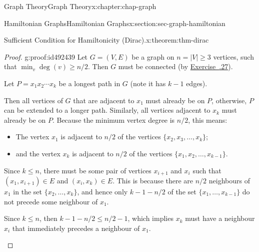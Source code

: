 \documentclass[oneside,10pt,]{book}
\newcommand{\xreffont}{\relax}
\numberwithin{equation}{section}
\begin{document}
\begin{chapterptx}{Graph Theory}{}{Graph Theory}{}{}{x:chapter:chap-graph}
\begin{sectionptx}{Hamiltonian Graphs}{}{Hamiltonian Graphs}{}{}{x:section:sec-graph-hamiltonian}
\begin{theorem}{Sufficient Condition for Hamiltonicity (Dirac).}{}{x:theorem:thm-dirac}
\end{theorem}
\begin{proof}{}{g:proof:id492439}
Let \(G = (V,E)\) be a graph on \(n = |V| \geq 3\) vertices, such that \(\min_v \deg(v) \geq n/2\). Then \(G\) must be connected (by \hyperlink{x:exercise:ex-deg-connected}{Exercise~{\xreffont 5.8.27}}).%
\par
Let \(P = x_1x_2\cdots x_k\) be a longest path in \(G\) (note it has \(k-1\) edges).%
\par
Then all vertices of \(G\) that are adjacent to \(x_1\) must already be on \(P\), otherwise, \(P\) can be extended to a longer path. Similarly, all vertices adjacent to \(x_k\) must already be on \(P\). Because the minimum vertex degree is \(n/2\), this means:%
\begin{itemize}[label=\textbullet]
\item{}The vertex \(x_1\) is adjacent to \(n/2\) of the vertices \(\{x_2,x_3,\ldots,x_k\}\);%
\item{}and the vertex \(x_k\) is adjacent to \(n/2\) of the vertices \(\{x_1,x_2,\ldots,x_{k-1}\}\).%
\end{itemize}
%
\par
Since \(k \leq n\), there must be some pair of vertices \(x_{i+1}\) and \(x_i\) such that \((x_1,x_{i+1}) \in E\) and \((x_i,x_k) \in E\). This is because there are \(n/2\) neighbours of \(x_1\) in the set \(\{x_2,\ldots,x_k\}\), and hence only \(k - 1 - n/2\) of the set \(\{x_1,\ldots,x_{k-1}\}\) do not precede some neighbour of \(x_1\).%
\par
Since \(k \leq n\), then \(k - 1 - n/2 \leq n/2-1\), which implies \(x_k\) must have a neighbour \(x_i\) that immediately precedes a neighbour of \(x_{1}\).%
\begin{sidebyside}{1}{0.2}{0.2}{0}%
\begin{sbspanel}{0.6}%
\end{sbspanel}
\end{sidebyside}
\end{proof}
\end{sectionptx}
\end{chapterptx}
\end{document}
